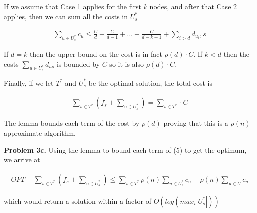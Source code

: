 \documentclass{article}
\begin{document}
\hfill

If we assume that Case 1 applies for the first $k$ nodes, and after that Case 2 applies, then we can sum all the costs in $U_s^*$

\begin{gather}
    \sum_{u \in U_s^*} c_u \leq \frac{C}{d} + \frac{C}{d-1} + ... + \frac{C}{d-k+1} + \sum_{i > d}d_{u_i}, s
\end{gather}

If $d=k$ then the upper bound on the cost is in fact $\rho(d) \cdot C$. If $k < d$ then the costs $\sum_{u \in U_s^*}d_{us}$ is bounded by $C$ so it is also $\rho(d) \cdot C$.

Finally, if we let $T^*$ and $U_s^*$ be the optimal solution, the total cost is

\begin{gather}
    \sum_{s \in T^*} (f_s + \sum_{u \in U_s^*}) = \sum_{s \in T^*} \cdot C
\end{gather}

The lemma bounds each term of the cost by $\rho(d)$ proving that this is a $\rho(n)$-approximate algorithm.

\hfill

\textbf{Problem 3c.} Using the lemma to bound each term of (5) to get the optimum, we arrive at 

\begin{gather}
    OPT -  \sum_{s \in T^*} (f_s + \sum_{u \in U_s^*}) \leq \sum_{s \in T^*} \rho(n) \sum_{u \in U_s^*} c_u - \rho(n) \sum_{u \in U} c_u
\end{gather}

which would return a solution within a factor of $O(log(max_i |U_s^*|))$

\newpage
 

\end{document}

